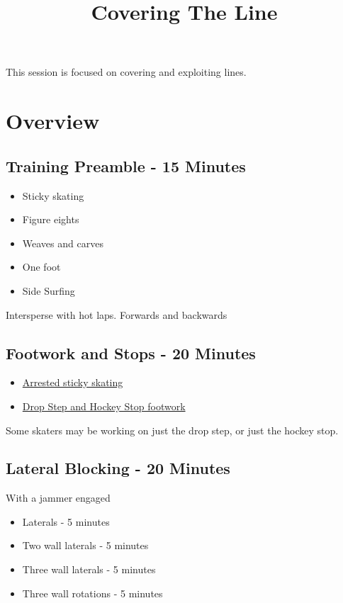 \documentclass{journal}
\title{Covering The Line}
\author{}
\begin{document}
\maketitle
\noindent 

This session is focused on covering and exploiting lines.

 

\section*{Overview}

\subsection*{Training Preamble - 15 Minutes}
\begin{itemize}
\item Sticky skating
\item Figure eights
\item Weaves and carves 
\item One foot  
\item Side Surfing
\end{itemize}
Intersperse with hot laps.
Forwards and backwards

\subsection*{Footwork and Stops - 20 Minutes}
\begin{itemize}
\item \hyperref[drill:stopping/arrested_sticky]{Arrested sticky skating}
\item \hyperref[drill:footwork/alternating_hockeys]{Drop Step and Hockey Stop footwork}
\end{itemize}

Some skaters may be working on just the drop step, or just the hockey stop.


\subsection*{Lateral Blocking - 20 Minutes}

With a jammer engaged

\begin{itemize}
    \item Laterals - 5 minutes
    \item Two wall laterals - 5 minutes
    \item Three wall laterals - 5 minutes
    \item Three wall rotations - 5 minutes
\end{itemize}
\end{document}

